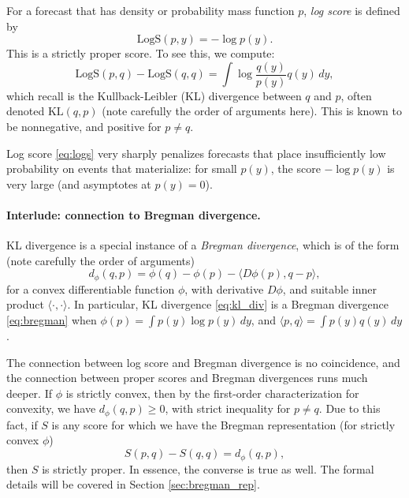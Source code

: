 \documentclass{article}
\begin{document}
\def\KL{\mathrm{KL}}

For a forecast that has density or probability mass function $p$, \emph{log
  score} is defined by 
\begin{equation}
\label{eq:logs}
\mathrm{LogS}(p, y) = -\log p(y).
\end{equation}
This is a strictly proper score. To see this, we compute:
\begin{equation}
\label{eq:kl_div}
\mathrm{LogS}(p, q) - \mathrm{LogS}(q, q) = \int \log \frac{q(y)}{p(y)} q(y) \, 
dy,
\end{equation}
which recall is the Kullback-Leibler (KL) divergence between $q$ and $p$, often
denoted $\KL(q,p)$ (note carefully the order of arguments here). This is known
to be nonnegative, and positive for $p \not= q$.

Log score \eqref{eq:logs} very sharply penalizes forecasts that place
insufficiently low probability on events that materialize: for small $p(y)$, the
score $-\log p(y)$ is very large (and asymptotes at $p(y) = 0$).  

\paragraph{Interlude: connection to Bregman divergence.}

KL divergence is a special instance of a \emph{Bregman divergence}, which is of
the form (note carefully the order of arguments)
\begin{equation}
\label{eq:bregman}
d_\phi(q,p) = \phi(q) - \phi(p) - \langle D\phi(p), q - p \rangle,
\end{equation}
for a convex differentiable function $\phi$, with derivative $D\phi$, and
suitable inner product $\langle \cdot, \cdot \rangle$. In particular, KL
divergence \eqref{eq:kl_div} is a Bregman divergence \eqref{eq:bregman} when
$\phi(p) = \int p(y) \log p(y) \, dy$, and $\langle p, q \rangle = \int p(y)
q(y) \, dy$.   

The connection between log score and Bregman divergence is no coincidence, and
the connection between proper scores and Bregman divergences runs much
deeper. If $\phi$ is strictly convex, then by the first-order characterization
for convexity, we have $d_\phi(q,p) \geq 0$, with strict inequality for $p \not= 
q$. Due to this fact, if $S$ is any score for which we have the Bregman
representation (for strictly convex $\phi$)   
\begin{equation}
\label{eq:bregman_rep}
S(p, q) - S(q, q) = d_\phi(q, p),
\end{equation}
then $S$ is strictly proper. In essence, the converse is true as well. The
formal details will be covered in Section \ref{sec:bregman_rep}. 
\end{document}
